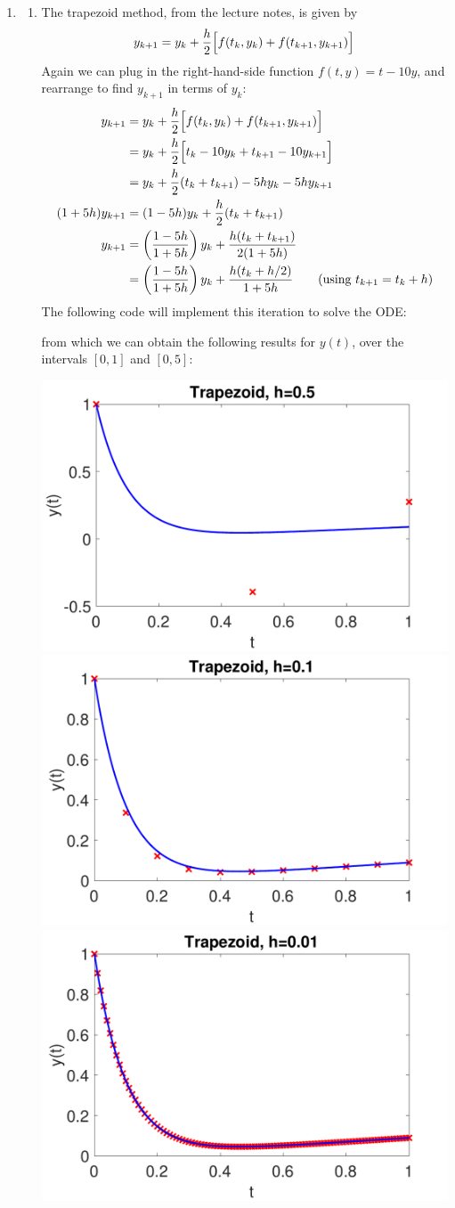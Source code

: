 \documentclass[a4paper,11pt]{article}
\begin{document}
\begin{enumerate}
   \item
   
   \begin{enumerate}
   
     \item The trapezoid method, from the lecture notes, is given by
       \begin{equation*}
         y_{k+1}=y_k+\frac{h}{2} \Bigl[ f(t_k,y_k)+f(t_{k+1},y_{k+1}) \Bigr]
       \end{equation*}
       Again we can plug in the right-hand-side function    $f(t,y)=t-10y$, and rearrange to find $y_{k+1}$ in terms of $y_k$:       
    \begin{align*}
      y_{k+1} &= y_k + \frac{h}{2}\Bigl[ f(t_k,y_k)+f(t_{k+1},y_{k+1}) \Bigr] \\
        &= y_k + \frac{h}{2}\Bigl[ t_k-10y_k + t_{k+1}-10y_{k+1} \Bigr]\\
        &= y_k + \frac{h}{2}(t_k+t_{k+1}) -5hy_k -5hy_{k+1}\\
        (1+5h)y_{k+1} &= (1-5h)y_k + \frac{h}{2}(t_k+t_{k+1})\\
        y_{k+1} &= \left(\frac{1-5h}{1+5h}\right)y_k + \frac{h(t_k+t_{k+1})}{2(1+5h)}\\
        &= \left(\frac{1-5h}{1+5h}\right)y_k + \frac{h(t_k+h/2)}{1+5h} \qquad\text{(using $t_{k+1}=t_k+h$)}
    \end{align*}
    The following code will implement this iteration to solve the ODE:
    
    from which we can obtain the following results for $y(t)$, over the intervals $[0,1]$ and $[0,5]$:
    \begin{center}
      \includegraphics[width=0.3\linewidth]{images/Q1c_1.pdf}
      \includegraphics[width=0.3\linewidth]{images/Q1c_2.pdf}
      \includegraphics[width=0.3\linewidth]{images/Q1c_3.pdf}\\

\end{center}
\end{enumerate}
\end{enumerate}
\end{document}
